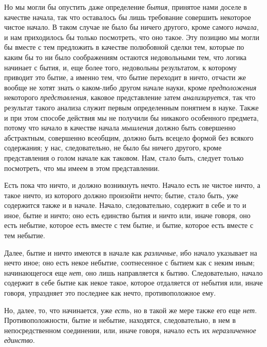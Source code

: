 Но мы могли бы опустить даже определение {\em бытия},
принятое нами доселе в качестве начала, так что оставалось бы лишь
требование совершить некоторое чистое начало. В таком случае не было бы
ничего другого, кроме самого {\em начала}, и нам
приходилось бы только посмотреть, что оно такое. Эту позицию мы могли бы
вместе с тем предложить в качестве полюбовной сделки тем, которые по каким
бы то ни было соображениям остаются недовольными тем, что логика начинает с
бытия, и, еще более того, недовольны результатом, к которому приводит это
бытие, а именно тем, что бытие переходит в ничто, отчасти же вообще не
хотят знать о каком-либо другом начале науки, кроме
{\em предположения} некоторого
{\em представления}, каковое представление затем
{\em анализируется}, так что результат такого анализа
служит первым определенным понятием в науке. Также и при этом способе
действия мы не получили бы никакого особенного предмета, потому что начало
в качестве начала {\em мышления} должно быть совершенно
абстрактным, совершенно всеобщим, должно быть всецело формой без всякого
содержания; у нас, следовательно, не было бы ничего другого, кроме
представления о голом начале как таковом. Нам, стало быть, следует только
посмотреть, что мы имеем в этом представлении.

Есть пока что ничто, и должно возникнуть нечто. Начало есть не чистое ничто,
а такое ничто, из которого должно произойти нечто; бытие, стало быть, уже
содержится также и в начале. Начало, следовательно, содержит в себе и то и
иное, бытие и ничто; оно есть единство бытия и ничто или, иначе говоря,
оно есть небытие, которое есть вместе с тем бытие, и бытие, которое есть
вместе с тем небытие.

Далее, бытие и ничто имеются в начале как
{\em различные}, ибо начало указывает на нечто иное;
оно есть некое небытие, соотнесенное с бытием как с неким иным;
начинающегося еще {\em нет}, оно лишь направляется к
бытию. Следовательно, начало содержит в себе бытие как некое такое, которое
отдаляется от небытия или, иначе говоря, упраздняет это последнее как
нечто, противоположное ему.

Но, далее, то, что начинается, уже {\em есть}, но в
такой же мере также его еще {\em нет}.
Противоположности, бытие и небытие, находятся, следовательно, в нем в
непосредственном соединении, или, иначе говоря, начало есть их
{\em неразличенное единство}.

